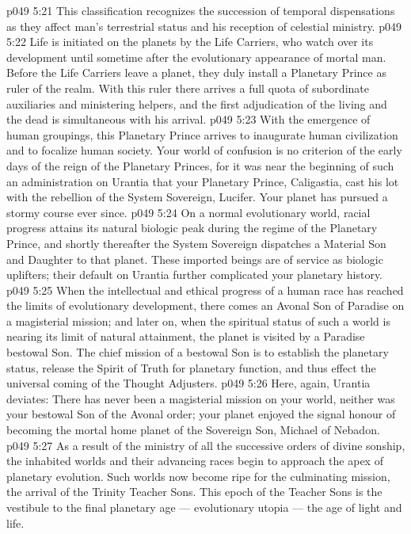 \vs p049 5:21 \bibnobreakspace {} This classification recognizes the succession of temporal dispensations as they affect man’s terrestrial status and his reception of celestial ministry.
\vs p049 5:22 Life is initiated on the planets by the Life Carriers, who watch over its development until sometime after the evolutionary appearance of mortal man. Before the Life Carriers leave a planet, they duly install a Planetary Prince as ruler of the realm. With this ruler there arrives a full quota of subordinate auxiliaries and ministering helpers, and the first adjudication of the living and the dead is simultaneous with his arrival.
\vs p049 5:23 With the emergence of human groupings, this Planetary Prince arrives to inaugurate human civilization and to focalize human society. Your world of confusion is no criterion of the early days of the reign of the Planetary Princes, for it was near the beginning of such an administration on Urantia that your Planetary Prince, Caligastia, cast his lot with the rebellion of the System Sovereign, Lucifer. Your planet has pursued a stormy course ever since.
\vs p049 5:24 On a normal evolutionary world, racial progress attains its natural biologic peak during the regime of the Planetary Prince, and shortly thereafter the System Sovereign dispatches a Material Son and Daughter to that planet. These imported beings are of service as biologic uplifters; their default on Urantia further complicated your planetary history.
\vs p049 5:25 When the intellectual and ethical progress of a human race has reached the limits of evolutionary development, there comes an Avonal Son of Paradise on a magisterial mission; and later on, when the spiritual status of such a world is nearing its limit of natural attainment, the planet is visited by a Paradise bestowal Son. The chief mission of a bestowal Son is to establish the planetary status, release the Spirit of Truth for planetary function, and thus effect the universal coming of the Thought Adjusters.
\vs p049 5:26 Here, again, Urantia deviates: There has never been a magisterial mission on your world, neither was your bestowal Son of the Avonal order; your planet enjoyed the signal honour of becoming the mortal home planet of the Sovereign Son, Michael of Nebadon.
\vs p049 5:27 As a result of the ministry of all the successive orders of divine sonship, the inhabited worlds and their advancing races begin to approach the apex of planetary evolution. Such worlds now become ripe for the culminating mission, the arrival of the Trinity Teacher Sons. This epoch of the Teacher Sons is the vestibule to the final planetary age --- evolutionary utopia --- the age of light and life.
